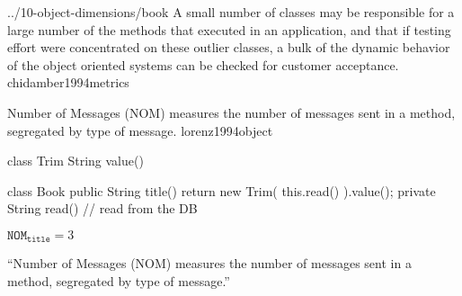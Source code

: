 \documentclass{article}
\begin{document}
\lnQuote
  {../10-object-dimensions/book}
  {A small number of classes may be responsible for a large number of the methods that executed in an application, and that if testing effort were concentrated on these outlier classes, a bulk of the dynamic behavior of the object oriented systems can be checked for customer acceptance.}
  {chidamber1994metrics}

  {Number of Messages (NOM) measures the number of messages sent in a method, segregated by type of message.}
  {lorenz1994object}

\begin{multicols}{2}
{\small\begin{ffcode}
class Trim
  String value()

class Book
  public String title()
    return new Trim(
      this.read()
    ).value();
  private String read()
    // read from the DB
\end{ffcode}
}
\par\columnbreak\par
\(\texttt{NOM}_\texttt{title} = 3\)\par
``Number of Messages (NOM) measures the number of messages sent in a method, segregated by type of message.''
\end{multicols}
\plush{}


\end{document}
